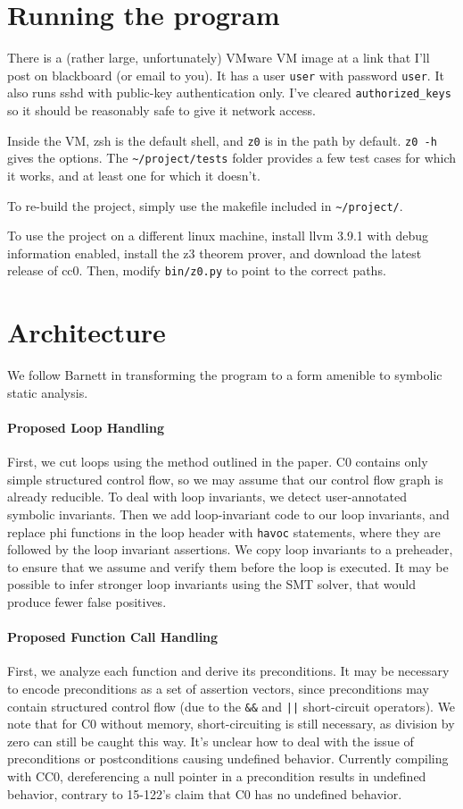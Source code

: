 \documentclass[12pt]{article}
\begin{document}
\section{Running the program}
There is a (rather large, unfortunately) VMware VM image at a link that I'll post on blackboard (or email to you). It has a user \texttt{user} with password \texttt{user}. It also runs sshd with public-key authentication only. I've cleared \verb|authorized_keys| so it should be reasonably safe to give it network access.

Inside the VM, zsh is the default shell, and \texttt{z0} is in the path by default. \texttt{z0 -h} gives the options. The \verb|~/project/tests| folder provides a few test cases for which it works, and at least one for which it doesn't.

To re-build the project, simply use the makefile included in \verb|~/project/|.

To use the project on a different linux machine, install llvm 3.9.1 with debug information enabled, install the z3 theorem prover, and download the latest release of cc0. Then, modify \texttt{bin/z0.py} to point to the correct paths.

\section{Architecture}
We follow Barnett \cite{Barnett:2005:WUP:1108768.1108813} in transforming the program to a form amenible to symbolic static analysis.

\paragraph{Proposed Loop Handling}
First, we cut loops using the method outlined in the paper. C0 contains only simple structured control flow, so we may assume that our control flow graph is already reducible.
To deal with loop invariants, we detect user-annotated symbolic invariants. Then we add loop-invariant code to our loop invariants, and replace phi functions in the loop header with \texttt{havoc} statements, where they are followed by the loop invariant assertions. We copy loop invariants to a preheader, to ensure that we assume and verify them before the loop is executed. It may be possible to infer stronger loop invariants using the SMT solver, that would produce fewer false positives.

\paragraph{Proposed Function Call Handling}
First, we analyze each function and derive its preconditions.
It may be necessary to encode preconditions as a set of assertion vectors, since preconditions may contain structured control flow (due to the \texttt{\&\&} and \texttt{||} short-circuit operators). We note that for C0 without memory, short-circuiting is still necessary, as division by zero can still be caught this way. It's unclear how to deal with the issue of preconditions or postconditions causing undefined behavior. Currently compiling with CC0, dereferencing a null pointer in a precondition results in undefined behavior, contrary to 15-122's claim that C0 has no undefined behavior.
\end{document}
